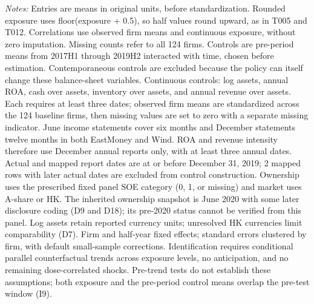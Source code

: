 \par\smallskip\noindent\begin{minipage}{\linewidth}\footnotesize
\textit{Notes:} Entries are means in original units, before standardization. Rounded exposure uses floor(exposure + 0.5), so half values round upward, as in T005 and T012. Correlations use observed firm means and continuous exposure, without zero imputation. Missing counts refer to all 124 firms. Controls are pre-period means from 2017H1 through 2019H2 interacted with time, chosen before estimation. Contemporaneous controls are excluded because the policy can itself change these balance-sheet variables. Continuous controls: log assets, annual ROA, cash over assets, inventory over assets, and annual revenue over assets. Each requires at least three dates; observed firm means are standardized across the 124 baseline firms, then missing values are set to zero with a separate missing indicator. June income statements cover six months and December statements twelve months in both EastMoney and Wind. ROA and revenue intensity therefore use December annual reports only, with at least three annual dates. Actual and mapped report dates are at or before December 31, 2019; 2 mapped rows with later actual dates are excluded from control construction. Ownership uses the prescribed fixed panel SOE category (0, 1, or missing) and market uses A-share or HK. The inherited ownership snapshot is June 2020 with some later disclosure coding (D9 and D18); its pre-2020 status cannot be verified from this panel. Log assets retain reported currency units; unresolved HK currencies limit comparability (D7). Firm and half-year fixed effects; standard errors clustered by firm, with default small-sample corrections. Identification requires conditional parallel counterfactual trends across exposure levels, no anticipation, and no remaining dose-correlated shocks. Pre-trend tests do not establish these assumptions; both exposure and the pre-period control means overlap the pre-test window (I9).
\end{minipage}\par\endgroup
